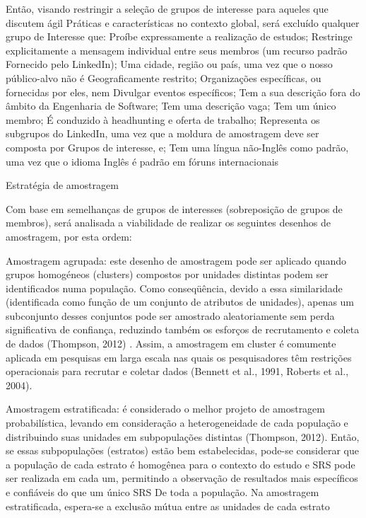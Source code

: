 Então, visando restringir a seleção de grupos de interesse para aqueles que
discutem ágil Práticas e características no contexto global, será excluído
qualquer grupo de Interesse que:
Proíbe expressamente a realização de estudos;
Restringe explicitamente a mensagem individual entre seus membros (um recurso padrão
Fornecido pelo LinkedIn);
Uma cidade, região ou país, uma vez que o nosso público-alvo não é
Geograficamente restrito;
Organizações específicas, ou fornecidas por eles, nem
Divulgar eventos específicos;
Tem a sua descrição fora do âmbito da Engenharia de Software;
Tem uma descrição vaga;
Tem um único membro;
É conduzido à headhunting e oferta de trabalho;
Representa os subgrupos do LinkedIn, uma vez que a moldura de amostragem deve
ser composta por Grupos de interesse, e; Tem uma língua não-Inglês como padrão,
uma vez que o idioma Inglês é padrão em fóruns internacionais

Estratégia de amostragem

Com base em semelhanças de grupos de interesses (sobreposição de grupos de membros), será analisada a viabilidade de realizar os seguintes desenhos de amostragem, por esta ordem:

Amostragem agrupada: este desenho de amostragem pode ser aplicado quando grupos
homogéneos (clusters) compostos por unidades distintas podem ser identificados
numa população. Como conseqüência, devido a essa similaridade (identificada como
função de um conjunto de atributos de unidades), apenas um subconjunto desses
conjuntos pode ser amostrado aleatoriamente sem perda significativa de
confiança, reduzindo também os esforços de recrutamento e coleta de dados
(Thompson, 2012) . Assim, a amostragem em cluster é comumente aplicada em
pesquisas em larga escala nas quais os pesquisadores têm restrições operacionais
para recrutar e coletar dados (Bennett et al., 1991, Roberts et al., 2004).


Amostragem estratificada: é considerado o melhor projeto de amostragem
probabilística, levando em consideração a heterogeneidade de cada população e
distribuindo suas unidades em subpopulações distintas (Thompson, 2012). Então,
se essas subpopulações (estratos) estão bem estabelecidas, pode-se considerar
que a população de cada estrato é homogênea para o contexto do estudo e SRS pode
ser realizada em cada um, permitindo a observação de resultados mais específicos
e confiáveis do que um único SRS De toda a população. Na amostragem
estratificada, espera-se a exclusão mútua entre as unidades de cada estrato

